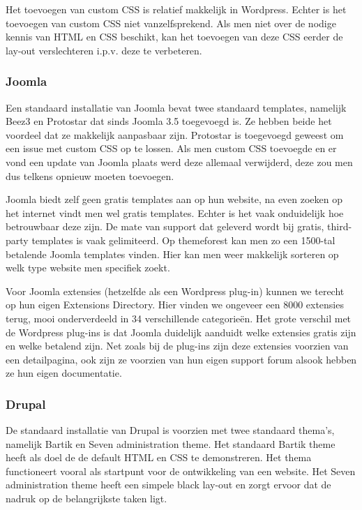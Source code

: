 Het toevoegen van custom CSS is relatief makkelijk in Wordpress. Echter is het toevoegen van custom CSS niet vanzelfsprekend. Als men niet over de nodige kennis van HTML en CSS beschikt, kan het toevoegen van deze CSS eerder de lay-out verslechteren i.p.v. deze te verbeteren.

\subsubsection{Joomla}
Een standaard installatie van Joomla bevat twee standaard templates, namelijk Beez3 en Protostar dat sinds Joomla 3.5 toegevoegd is. Ze hebben beide het voordeel dat ze makkelijk aanpasbaar zijn. Protostar is toegevoegd geweest om een issue met custom CSS op te lossen. Als men custom CSS toevoegde en er vond een update van Joomla plaats werd deze allemaal verwijderd, deze zou men dus telkens opnieuw moeten toevoegen.

Joomla biedt zelf geen gratis templates aan op hun website, na even zoeken op het internet vindt men wel gratis templates. Echter is het vaak onduidelijk hoe betrouwbaar deze zijn. De mate van support dat geleverd wordt bij gratis, third-party templates is vaak gelimiteerd. Op themeforest kan men zo een 1500-tal betalende Joomla templates vinden. Hier kan men weer makkelijk sorteren op welk type website men specifiek zoekt.

Voor Joomla extensies (hetzelfde als een Wordpress plug-in) kunnen we terecht op hun eigen Extensions Directory. Hier vinden we ongeveer een 8000 extensies terug, mooi onderverdeeld in 34 verschillende categorieën. Het grote verschil met de Wordpress plug-ins is dat Joomla duidelijk aanduidt welke extensies gratis zijn en welke betalend zijn. Net zoals bij de plug-ins zijn deze extensies voorzien van een detailpagina, ook zijn ze voorzien van hun eigen support forum alsook hebben ze hun eigen documentatie.

\subsubsection{Drupal}
De standaard installatie van Drupal is voorzien met twee standaard thema's, namelijk Bartik en Seven administration theme. Het standaard Bartik theme heeft als doel de de default HTML en CSS te demonstreren. Het thema functioneert vooral als startpunt voor de ontwikkeling van een website. Het Seven administration theme heeft een simpele black lay-out en zorgt ervoor dat de nadruk op de belangrijkste taken ligt. 

